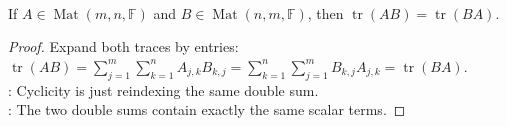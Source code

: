 \begin{proposition} \label{prop:trace-cyclicity-two-factors} \\
If $A\in\operatorname{Mat}(m,n,\mathbb{F})$ and $B\in\operatorname{Mat}(n,m,\mathbb{F})$, then $\operatorname{tr}(AB)=\operatorname{tr}(BA)$.
\begin{proof}
Expand both traces by entries: $\operatorname{tr}(AB) =\sum\limits_{j=1}^{m}\sum\limits_{k=1}^{n}A_{j,k}B_{k,j} =\sum\limits_{k=1}^{n}\sum\limits_{j=1}^{m}B_{k,j}A_{j,k} =\operatorname{tr}(BA)$.\\
: Cyclicity is just reindexing the same double sum.\\
: The two double sums contain exactly the same scalar terms.
\end{proof}
\end{proposition}

